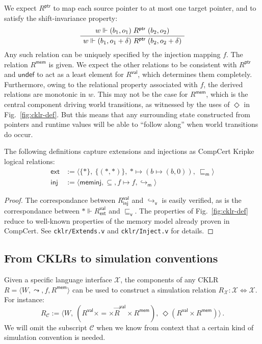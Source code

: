 \documentclass[sigplan,10pt,review,anonymous]{acmart}
\newcommand{\kw}[1]{\ensuremath{ \mathsf{#1} }}
\newcommand{\vref}{\sqsubseteq_\kw{v}}
\newcommand{\mext}{\sqsubseteq_\kw{m}}
\begin{document}
We expect $R^\kw{ptr}$ to map
each source pointer to at most one target pointer,
and to satisfy the shift-invariance property:
\[
  \AxiomC{$w \Vdash (b_1, o_1) \mathrel{R^\kw{ptr}} (b_2, o_2)$}
  \UnaryInfC{$w \Vdash (b_1, o_1 + \delta) \mathrel{R^\kw{ptr}} (b_2, o_2 + \delta)$}
  \DisplayProof
\]
Any such relation can be uniquely specified by
the injection mapping $f$.
The relation $R^\kw{mem}$ is given.
We expect the other relations to be consistent with $R^\kw{ptr}$
and $\kw{undef}$ to act as a least element for $R^\kw{val}$,
which determines them completely.
Furthermore, owing to the relational property associated with $f$,
the derived relations are monotonic in $w$.
This may not be the case for $R^\kw{mem}$,
which is the central component driving world transitions,
as witnessed by the uses of $\Diamond$ in Fig.~\ref{fig:cklr-def}.
But this means that any surrounding state
constructed from pointers and runtime values
will be able to ``follow along'' when
world transitions do occur.

\begin{theorem}
The following definitions capture extensions and
injections as CompCert Kripke logical relations:
\begin{align*}
  \kw{ext} &:=
    \langle \{*\}, \: \{(*,*)\}, \: * \mapsto (b \mapsto (b, 0)), \:
    {\mext} \rangle
  \\
  \kw{inj} &:=
    \langle \kw{meminj}, {\subseteq}, f \mapsto f,
      {\hookrightarrow_\kw{m}} \rangle
\end{align*}
\begin{proof}
The correspondance between $R^\kw{val}_\kw{inj}$ and
$\hookrightarrow_\kw{v}$ is easily verified,
as is the correspondance between
$* \Vdash R^\kw{val}_\kw{ext}$ and $\vref$.
The properties of Fig.~\ref{fig:cklr-def}
reduce to well-known properties of the memory model
already proven in CompCert.
See \texttt{cklr/Extends.v} and \texttt{cklr/Inject.v}
for details.
\end{proof}
\end{theorem}


\subsection{From CKLRs to simulation conventions} \label{sec:param} %

Given a specific language interface $\mathcal{X}$,
the components of any CKLR
$R = \langle W, {\leadsto}, f, R^\kw{mem} \rangle$
can be used to construct a simulation relation
$R_\mathcal{X} : \mathcal{X} \Leftrightarrow \mathcal{X}$.
For instance:
\[
  R_\mathcal{C} :=
    \langle
      W, \:
      (R^\kw{val} \times {=} \times \vec{R}^\kw{val} \times R^\kw{mem}), \:
      \Diamond (R^\kw{val} \times R^\kw{mem})
    \rangle \,.
\]
We will omit the subscript $\mathcal{C}$ when we know from context
that a certain kind of simulation convention is needed.
\end{document}
